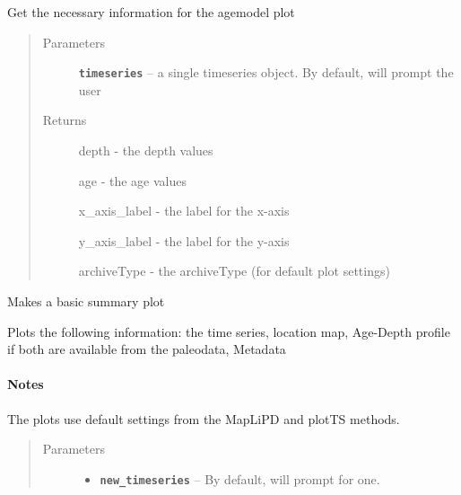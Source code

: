 \documentclass[letterpaper,10pt,english]{sphinxmanual}
\begin{document}
\begin{fulllineitems}
\begin{fulllineitems}
\end{fulllineitems}


\begin{fulllineitems}
\label{SummaryPlots:pyleoclim.SummaryPlots.agemodelData}
Get the necessary information for the agemodel plot
\begin{quote}\begin{description}
\item[{Parameters}] \leavevmode
\textbf{\texttt{timeseries}} -- a single timeseries object. By default, will
prompt the user

\item[{Returns}] \leavevmode

depth - the depth values

age - the age values

x\_axis\_label - the label for the x-axis

y\_axis\_label - the label for the y-axis

archiveType - the archiveType (for default plot settings)


\end{description}\end{quote}

\end{fulllineitems}


\begin{fulllineitems}
\label{SummaryPlots:pyleoclim.SummaryPlots.basic}
Makes a basic summary plot

Plots the following information: the time series, location map,
Age-Depth profile if both are available from the paleodata, Metadata
\paragraph{Notes}

The plots use default settings from the MapLiPD and plotTS methods.
\begin{quote}\begin{description}
\item[{Parameters}] \leavevmode\begin{itemize}
\item {} 
\textbf{\texttt{new\_timeseries}} -- By default, will prompt for one.


\end{itemize}
\end{description}
\end{quote}
\end{fulllineitems}
\end{fulllineitems}
\end{document}
